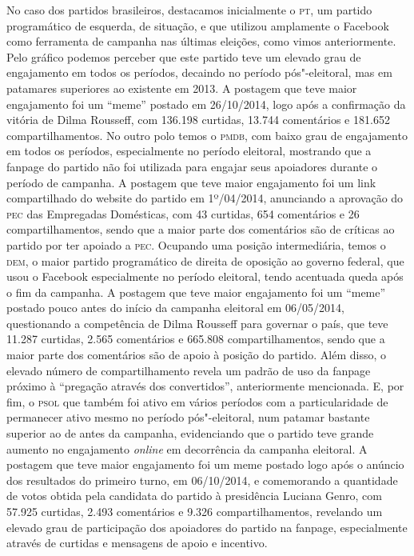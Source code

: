 No caso dos partidos brasileiros, destacamos inicialmente o \textsc{pt}, um
partido programático de esquerda, de situação, e que utilizou amplamente
o Facebook como ferramenta de campanha nas últimas eleições, como vimos
anteriormente. Pelo gráfico podemos perceber que este partido teve um
elevado grau de engajamento em todos os períodos, decaindo no período
pós"-eleitoral, mas em patamares superiores ao existente em 2013. A
postagem que teve maior engajamento foi um ``meme'' postado em
26/10/2014, logo após a confirmação da vitória de Dilma Rousseff, com
136.198 curtidas, 13.744 comentários e 181.652 compartilhamentos. No
outro polo temos o \textsc{pmdb}, com baixo grau de engajamento em todos os
períodos, especialmente no período eleitoral, mostrando que a fanpage do
partido não foi utilizada para engajar seus apoiadores durante o período
de campanha. A postagem que teve maior engajamento foi um link
compartilhado do website do partido em 1º/04/2014, anunciando a
aprovação do \textsc{pec} das Empregadas Domésticas, com 43 curtidas, 654
comentários e 26 compartilhamentos, sendo que a maior parte dos
comentários são de críticas ao partido por ter apoiado a \textsc{pec}. Ocupando
uma posição intermediária, temos o \textsc{dem}, o maior partido programático de
direita de oposição ao governo federal, que usou o Facebook
especialmente no período eleitoral, tendo acentuada queda após o fim da
campanha. A postagem que teve maior engajamento foi um ``meme'' postado
pouco antes do início da campanha eleitoral em 06/05/2014, questionando
a competência de Dilma Rousseff para governar o país, que teve 11.287
curtidas, 2.565 comentários e 665.808 compartilhamentos, sendo que a
maior parte dos comentários são de apoio à posição do partido. Além
disso, o elevado número de compartilhamento revela um padrão de uso da
fanpage próximo à ``pregação através dos convertidos'', anteriormente
mencionada. E, por fim, o \textsc{psol} que também foi ativo em vários períodos
com a particularidade de permanecer ativo mesmo no período
pós"-eleitoral, num patamar bastante superior ao de antes da campanha,
evidenciando que o partido teve grande aumento no engajamento \emph{\emph{online}} em
decorrência da campanha eleitoral. A postagem que teve maior engajamento
foi um meme postado logo após o anúncio dos resultados do primeiro
turno, em 06/10/2014, e comemorando a quantidade de votos obtida pela
candidata do partido à presidência Luciana Genro, com 57.925 curtidas,
2.493 comentários e 9.326 compartilhamentos, revelando um
elevado grau de participação dos apoiadores do partido na fanpage,
especialmente através de curtidas e mensagens de apoio e incentivo.

